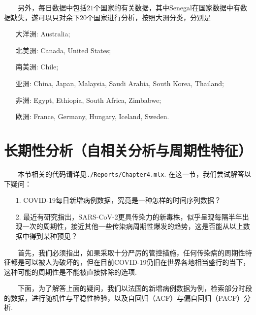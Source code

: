 \documentclass[a4paper, titlepage]{article}
\begin{document}
    　　另外，每日数据中包括$21$个国家的有关数据，其中Senegal在国家数据中有数据缺失，遂可以只对余下$20$个国家进行分析，按照大洲分类，分别是
    \vspace{5pt}
    \begin{adjustwidth}{1cm}{0cm}
    {\kaishu
    \begin{itemize}[itemsep=-1pt,topsep=1pt]
        \item [大洋洲:] Australia;
        \item [北美洲:]Canada, United States;
        \item [南美洲:]Chile;
        \item [亚洲:]China, Japan, Malaysia, Saudi Arabia, South Korea, Thailand;
        \item [非洲:]Egypt, Ethiopia, South Africa, Zimbabwe;
        \item [欧洲:]France, Germany, Hungary, Iceland, Sweden.
    \end{itemize}
    }
    \end{adjustwidth}

    \newpage
    \section{长期性分析（自相关分析与周期性特征）}\label{自相关分析}
        　　本节相关的代码请详见\texttt{./Reports/Chapter4.mlx}. 在这一节，我们尝试解答以下疑问：
        \begin{enumerate}
            \item [1.] COVID-19每日新增病例数据，究竟是一种怎样的时间序列数据？
            \item [2.] 最近有研究指出，SARS-CoV-2更具传染力的新毒株，似乎呈现每隔半年出现一次的周期性，接近其他一些传染病周期性爆发的趋势，这是否能从以上数据中得到某种预见？
        \end{enumerate}
        
        　　首先，我们必须指出，如果采取十分严厉的管控措施，任何传染病的周期性特征都是可以被人为破坏的，但在目前COVID-19仍旧在世界各地相当盛行的当下，这种可能的周期性是不能被直接排除的选项.

        　　下面，为了解答上面的疑问，我们以法国的新增病例数据为例，检索部分时段的数据，进行随机性与平稳性检验，以及自回归（ACF）与偏自回归（PACF）分析. 
\end{document}
